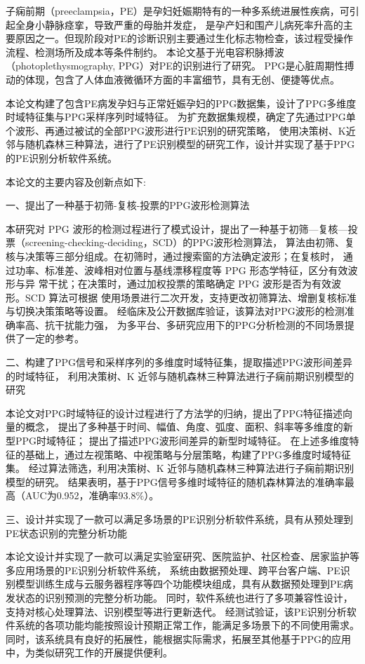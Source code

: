 \cleardoublepage
{}
子痫前期（preeclampsia，PE）是孕妇妊娠期特有的一种多系统进展性疾病，可引起全身小静脉痉挛，导致严重的母胎并发症，
是孕产妇和围产儿病死率升高的主要原因之一。但现阶段对PE的诊断识别主要通过生化标志物检查，该过程受操作流程、检测场所及成本等条件制约。
本论文基于光电容积脉搏波（photoplethysmography, PPG）对PE的识别进行了研究。
PPG是心脏周期性搏动的体现，包含了人体血液微循环方面的丰富细节，具有无创、便捷等优点。

本论文构建了包含PE病发孕妇与正常妊娠孕妇的PPG数据集，设计了PPG多维度时域特征集与PPG采样序列时域特征。
为扩充数据集规模，确定了先通过PPG单个波形、再通过被试的全部PPG波形进行PE识别的研究策略，
使用决策树、K近邻与随机森林三种算法，进行了PE识别模型的研究工作，设计并实现了基于PPG的PE识别分析软件系统。

本论文的主要内容及创新点如下:

一、提出了一种基于初筛-复核-投票的PPG波形检测算法

本研究对 PPG 波形的检测过程进行了模式设计，提出了一种基于初筛—复核—投票（screening-checking-deciding，SCD）的PPG波形检测算法，
算法由初筛、复核与决策等三部分组成。在初筛时，通过搜索窗的方法确定波形；在复核时，
通过功率、标准差、波峰相对位置与基线漂移程度等 PPG 形态学特征，区分有效波形与异
常干扰；在决策时，通过加权投票的策略确定 PPG 波形是否为有效波形。SCD 算法可根据
使用场景进行二次开发，支持更改初筛算法、增删复核标准与切换决策策略等设置。
经临床及公开数据库验证，该算法对PPG波形的检测准确率高、抗干扰能力强，
为多平台、多研究应用下的PPG分析检测的不同场景提供了一定的参考。

二、构建了PPG信号和采样序列的多维度时域特征集，提取描述PPG波形间差异的时域特征，
利用决策树、K 近邻与随机森林三种算法进行子痫前期识别模型的研究

本论文对PPG时域特征的设计过程进行了方法学的归纳，提出了PPG特征描述向量的概念，
提出了多种基于时间、幅值、角度、弧度、面积、斜率等多维度的新型PPG时域特征；
提出了描述PPG波形间差异的新型时域特征。
在上述多维度特征的基础上，通过左视策略、中视策略与分层策略，构建了PPG多维度时域特征集。
经过算法筛选，利用决策树、K 近邻与随机森林三种算法进行子痫前期识别模型的研究。
结果表明，基于PPG信号多维时域特征的随机森林算法的准确率最高（AUC为0.952，准确率93.8\%）。

三、设计并实现了一款可以满足多场景的PE识别分析软件系统，具有从预处理到PE状态识别的完整分析功能

本论文设计并实现了一款可以满足实验室研究、医院监护、社区检查、居家监护等多应用场景的PE识别分析软件系统，
系统由数据预处理、跨平台客户端、PE识别模型训练生成与云服务器程序等四个功能模块组成，具有从数据预处理到PE病发状态的识别预测的完整分析功能。
同时，软件系统也进行了多项兼容性设计，支持对核心处理算法、识别模型等进行更新迭代。
经测试验证，该PE识别分析软件系统的各项功能均能按照设计预期正常工作，能满足多场景下的不同使用需求。
同时，该系统具有良好的拓展性，能根据实际需求，拓展至其他基于PPG的应用中，为类似研究工作的开展提供便利。

